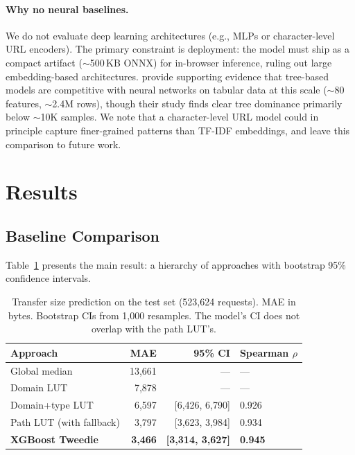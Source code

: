 \documentclass[sigconf,nonacm]{acmart}
\newcommand{\numtestrows}{523{,}624\xspace}
\begin{document}
\paragraph{Why no neural baselines.}
We do not evaluate deep learning architectures (e.g., MLPs or character-level URL encoders).
The primary constraint is deployment: the model must ship as a compact artifact ($\sim$500\,KB ONNX) for in-browser inference, ruling out large embedding-based architectures.
\citet{grinsztajn2022tree} provide supporting evidence that tree-based models are competitive with neural networks on tabular data at this scale ($\sim$80 features, $\sim$2.4M rows), though their study finds clear tree dominance primarily below $\sim$10K samples.
We note that a character-level URL model could in principle capture finer-grained patterns than TF-IDF embeddings, and leave this comparison to future work.

\section{Results}
\label{sec:results}

\subsection{Baseline Comparison}
\label{sec:baselines}

Table~\ref{tab:main-results} presents the main result: a hierarchy of approaches with bootstrap 95\% confidence intervals.

\begin{table}[t]
\centering
\small
\begin{tabular}{lrrl}
\toprule
Approach & MAE & 95\% CI & Spearman $\rho$ \\
\midrule
Global median & 13,661 & --- & --- \\
Domain LUT & 7,878 & --- & --- \\
Domain+type LUT & 6,597 & [6,426, 6,790] & 0.926 \\
Path LUT (with fallback) & 3,797 & [3,623, 3,984] & 0.934 \\
\textbf{XGBoost Tweedie} & \textbf{3,466} & \textbf{[3,314, 3,627]} & \textbf{0.945} \\
\bottomrule
\end{tabular}
\caption{Transfer size prediction on the test set (\numtestrows requests). MAE in bytes. Bootstrap CIs from 1,000 resamples. The model's CI does not overlap with the path LUT's.}
\label{tab:main-results}
\end{table}
\end{document}
